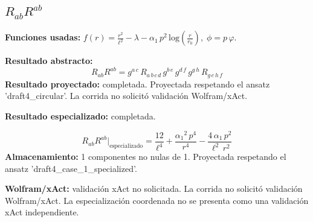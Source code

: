 \documentclass[11pt]{article}
\begin{document}
\subsection*{$ R_{ab}R^{ab} $}
\textbf{Funciones usadas:} $ f\!\left(r\right) = \frac{{r}^{2}}{{\ell}^{2}} - \lambda - \alpha_{1}\,{p}^{2}\,\mathrm{log}\!\left(\frac{r}{r_{0}}\right),\;\phi=p\,\varphi $.\par
\textbf{Resultado abstracto:}
\begin{dmath*}[breakdepth={5}]
R_{ab}R^{ab} = g{}^{a\,c}\,R{}_{a\,b\,c\,d}\,g{}^{b\,e}\,g{}^{d\,f}\,g{}^{g\,h}\,R{}_{g\,e\,h\,f}
\end{dmath*}
\textbf{Resultado proyectado:} completada. Proyectada respetando el ansatz 'draft4\_circular'. La corrida no solicitó validación Wolfram/xAct.\par
\textbf{Resultado especializado:} completada.\par
\begin{dmath*}[breakdepth={5}]
R_{ab}R^{ab}\big|_{\mathrm{especializado}} = \frac{12}{{\ell}^{4}} + \frac{{\alpha_{1}}^{2}\,{p}^{4}}{{r}^{4}} - \frac{4\,\alpha_{1}\,{p}^{2}}{{\ell}^{2}\,{r}^{2}}
\end{dmath*}
\textbf{Almacenamiento:} 1 componentes no nulas de 1. Proyectada respetando el ansatz 'draft4\_case\_1\_specialized'.\par
\textbf{Wolfram/xAct:} validación xAct no solicitada. La corrida no solicitó validación Wolfram/xAct. La especialización coordenada no se presenta como una validación xAct independiente.\par\medskip
{}
\end{document}
